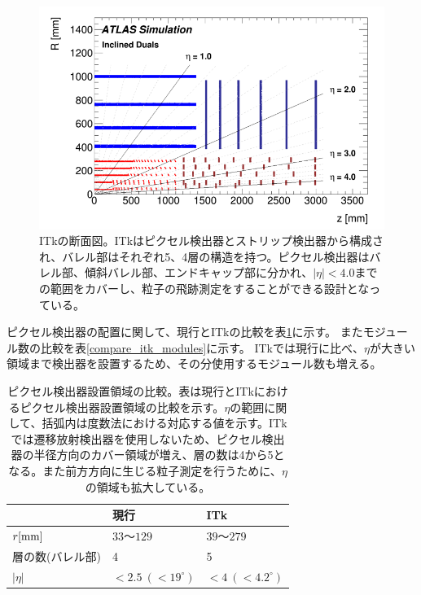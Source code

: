 \begin{figure}[bpt]\centering
\includegraphics[width=12cm]{./itk_cross_section.png}
\caption[ITkの断面図]{ITkの断面図\cite{1-3}。ITkはピクセル検出器とストリップ検出器から構成され、バレル部はそれぞれ5、4層の構造を持つ。ピクセル検出器はバレル部、傾斜バレル部、エンドキャップ部に分かれ、$|\eta|<4.0$までの範囲をカバーし、粒子の飛跡測定をすることができる設計となっている。}
\label{itk_cross_section}
\end{figure}

ピクセル検出器の配置に関して、現行とITkの比較を表\ref{compare_itk_pixel}に示す。
またモジュール数の比較を表\ref{compare_itk_modules}に示す。
ITkでは現行に比べ、$\eta$が大きい領域まで検出器を設置するため、その分使用するモジュール数も増える。

\begin{table}[tbp]
\begin{center}
\caption[ピクセル検出器設置領域の比較]{ピクセル検出器設置領域の比較。表は現行とITkにおけるピクセル検出器設置領域の比較を示す。$\eta$の範囲に関して、括弧内は度数法における対応する値を示す。ITkでは遷移放射検出器を使用しないため、ピクセル検出器の半径方向のカバー領域が増え、層の数は4から5となる。また前方方向に生じる粒子測定を行うために、$\eta$の領域も拡大している。}
\label{compare_itk_pixel}
  \begin{tabular}{|lll|} \hline
    & 現行 & ITk \\ \hline
    $r[\rm{mm}]$ & $33〜129$ & $39〜279$ \\ 
    層の数(バレル部) & 4 & 5 \\ 
    $|\eta|$ & $<2.5~(<19^\circ)$ & $<4~(<4.2^\circ)$ \\ \hline
  \end{tabular}
\end{center}
\end{table}

